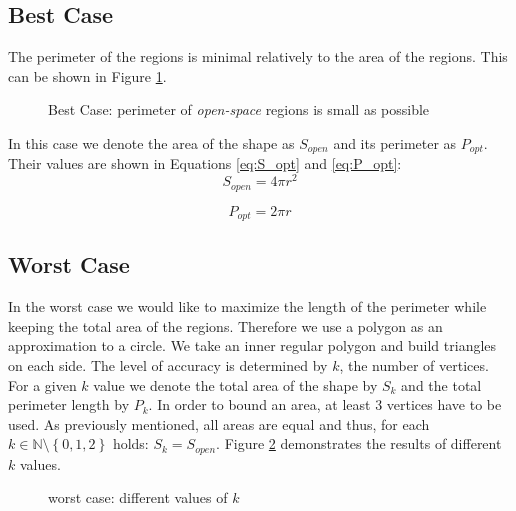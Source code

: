 \subsection{\WFD Best Case}
The perimeter of the \openspace regions is minimal relatively to
the area of the \openspace regions. This can be shown in Figure
\ref{fig:wfd_best_case}.
\begin{figure}
  \centering
  
	\caption{\WFD Best Case: perimeter of \emph{open-space} regions
	is small as possible}
	\label{fig:wfd_best_case}
\end{figure}
In this case we denote the area of the shape as $S_{open}$ and its perimeter as
$P_{opt}$. Their values are shown in Equations \eqref{eq:S_opt} and
\eqref{eq:P_opt}:
\begin{equation}\label{eq:S_opt}
S_{open} = 4\pi r^2
\end{equation}

\begin{equation}\label{eq:P_opt}
P_{opt} = 2\pi r
\end{equation}

\subsection{\WFD Worst Case}
In the worst case we would like to maximize the length of the perimeter while
keeping the total area of the \openspace regions. Therefore we use a polygon as
an approximation to a circle. We take an inner regular polygon and build
triangles on each side. The level of accuracy is determined by $k$, the number
of vertices.
For a given $k$ value we denote the total area of the shape by $S_k$ and the
total perimeter length by $P_k$. In order to bound an area, at least 3
vertices have to be used. As previously mentioned, all areas are equal and thus,
for each $k \in \mathbb{N}\setminus\left\{0,1,2\right\}$ holds: $S_k = S_{open}$.
Figure \ref{fig:wfd_worst_case_polygons} demonstrates the results of different
$k$ values.

\begin{figure}
 \centering
 \subfigure[$k=4$] {
	 
	 \label{fig:polygon_4}
 }
 \subfigure[$k=8$] {
	 
	 \label{fig:polygon_8}
 }
 \subfigure[$k=16$] {
	 
	 \label{fig:polygon_16}
 }
 \subfigure[$k=32$] {
	 
	 \label{fig:polygon_32}
 }
 \caption{\WFD worst case: different values of $k$}
 \label{fig:wfd_worst_case_polygons}
\end{figure}


